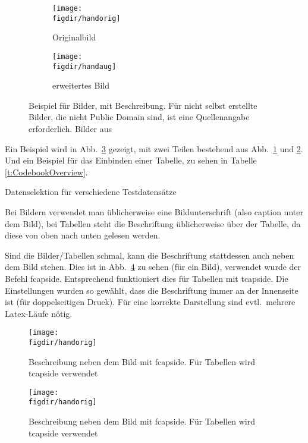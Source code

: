 \begin{figure}[t]
	\centering
	\begin{subfigure}{0.35\linewidth}
		\centering
		\texttt{[image: \\figdir/handorig]}
		\caption{Originalbild}
		\label{FIG:arexorig}
	\end{subfigure}
	\hspace{1cm}
	\begin{subfigure}{0.35\linewidth}
		\centering
		\texttt{[image: \\figdir/handaug]}
		\caption{erweitertes Bild}
		\label{FIG:arexaugm}
	\end{subfigure}
	\caption[AR Beispiel]{Beispiel für Bilder, mit Beschreibung. Für nicht selbst erstellte Bilder, die nicht Public Domain sind, ist eine Quellenangabe erforderlich. Bilder aus \cite{lion2010}}
	\label{FIG:arex}
\end{figure}

Ein Beispiel wird in Abb.\ \ref{FIG:arex} gezeigt, mit zwei Teilen  bestehend aus Abb.\ \ref{FIG:arexorig} und \ref{FIG:arexaugm}.
Und ein Beispiel für das Einbinden einer Tabelle, zu sehen in Tabelle \ref{t:CodebookOverview}.

\begin{table}[t]
	\centering\small
	\caption[Testtabelle]{Datenselektion für verschiedene Testdatensätze}
	\label{t:CodebookOverview}
	
\end{table}

Bei Bildern verwendet man üblicherweise eine Bildunterschrift (also caption  unter dem Bild), bei Tabellen steht die Beschriftung üblicherweise über der Tabelle, da diese von oben nach unten gelesen werden.

Sind die Bilder/Tabellen schmal, kann die Beschriftung stattdessen auch neben dem Bild stehen.
Dies ist in Abb.\ \ref{fig:beschreibung-neben-bild} zu sehen (für ein Bild), verwendet wurde der Befehl fcapside.
Entsprechend funktioniert dies für Tabellen mit tcapside.
Die Einstellungen wurden so gewählt, dass die Beschriftung immer an der Innenseite ist (für doppelseitigen Druck).
Für eine korrekte Darstellung sind evtl.\ mehrere Latex-Läufe nötig.

\begin{figure}[t]
	\fcapside
	{\caption{Beschreibung neben dem Bild mit fcapside. Für Tabellen wird tcapside verwendet}
	\label{fig:beschreibung-neben-bild}}
	{\texttt{[image: \\figdir/handorig]}}
\end{figure}

\begin{figure}[t]
	\fcapside
	{\caption{Beschreibung neben dem Bild mit fcapside. Für Tabellen wird tcapside verwendet}
	\label{fig:beschreibung-neben-bild-2}}
	{\texttt{[image: \\figdir/handorig]}}
\end{figure}


